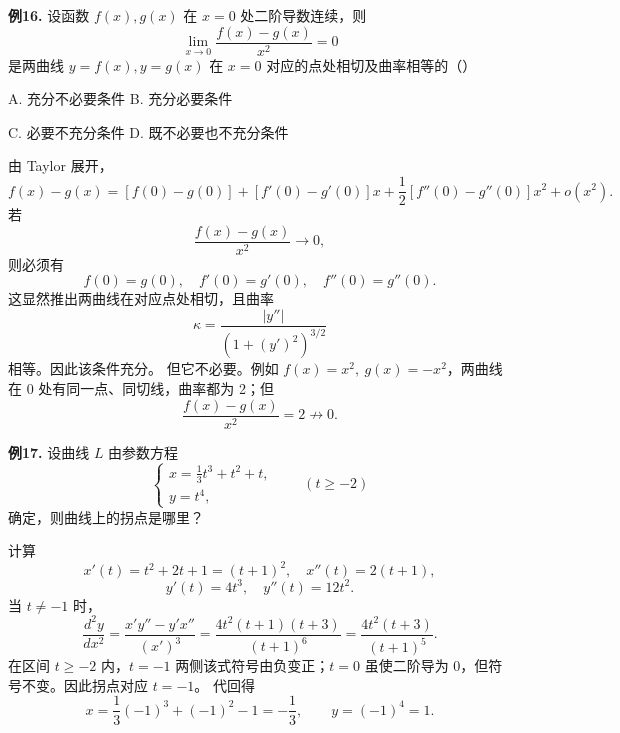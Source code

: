 \begin{problemblock}
\textbf{例16.} 设函数 \(f(x),g(x)\) 在 \(x=0\) 处二阶导数连续，则
\[
\lim_{x\to0}\frac{f(x)-g(x)}{x^2}=0
\]
是两曲线 \(y=f(x),y=g(x)\) 在 \(x=0\) 对应的点处相切及曲率相等的（\quad）

A. 充分不必要条件 \qquad B. 充分必要条件

C. 必要不充分条件 \qquad D. 既不必要也不充分条件
\end{problemblock}
\begin{solutionblock}
由 Taylor 展开，
\[
f(x)-g(x)=[f(0)-g(0)]+[f'(0)-g'(0)]x+\frac{1}{2}[f''(0)-g''(0)]x^2+o(x^2).
\]
若
\[
\frac{f(x)-g(x)}{x^2}\to0,
\]
则必须有
\[
f(0)=g(0),\quad f'(0)=g'(0),\quad f''(0)=g''(0).
\]
这显然推出两曲线在对应点处相切，且曲率
\[
\kappa=\frac{|y''|}{(1+(y')^2)^{3/2}}
\]
相等。因此该条件充分。
但它不必要。例如 \(f(x)=x^2,\ g(x)=-x^2\)，两曲线在 0 处有同一点、同切线，曲率都为 2；但
\[
\frac{f(x)-g(x)}{x^2}=2\not\to0.
\]
\end{solutionblock}

\begin{problemblock}
\textbf{例17.} 设曲线 \(L\) 由参数方程
\[
\begin{cases}
x=\frac13t^3+t^2+t,\\
y=t^4,
\end{cases}\qquad (t\ge -2)
\]
确定，则曲线上的拐点是哪里？
\end{problemblock}
\begin{solutionblock}
计算
\[
x'(t)=t^2+2t+1=(t+1)^2,
\quad x''(t)=2(t+1),
\]
\[
y'(t)=4t^3,
\quad y''(t)=12t^2.
\]
当 \(t\ne-1\) 时，
\[
\frac{d^2y}{dx^2}
=\frac{x'y''-y'x''}{(x')^3}
=\frac{4t^2(t+1)(t+3)}{(t+1)^6}
=\frac{4t^2(t+3)}{(t+1)^5}.
\]
在区间 \(t\ge-2\) 内，\(t=-1\) 两侧该式符号由负变正；\(t=0\) 虽使二阶导为 0，但符号不变。因此拐点对应 \(t=-1\)。
代回得
\[
x=\frac13(-1)^3+(-1)^2-1=-\frac13,
\qquad y=(-1)^4=1.
\]
\end{solutionblock}

